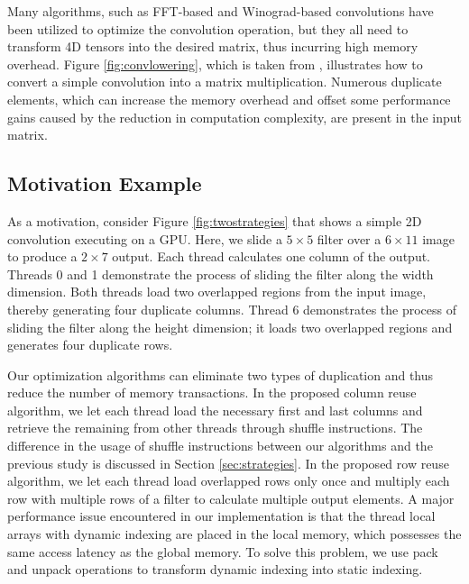 Many algorithms, such as FFT-based and Winograd-based convolutions have been utilized to optimize the convolution operation, but they all need to
transform 4D tensors into the desired matrix, thus incurring high memory overhead. Figure \ref{fig:convlowering}, which is taken from
\cite{ChetlurWVCTCS14}, illustrates how to convert a simple convolution into a matrix multiplication. Numerous duplicate elements, which can increase the memory overhead and offset some performance gains caused by the reduction in computation complexity, are present in the input matrix.


\subsection{Motivation Example}

As a motivation, consider Figure \ref{fig:twostrategies} that shows a simple 2D convolution executing on a GPU. Here, we slide a $5 \times
5$ filter over a $6 \times 11$ image to produce a $2 \times 7$ output. Each thread calculates one column of the output. Threads 0 and 1
demonstrate the process of sliding the filter along the width dimension. Both threads load two overlapped regions from the input image,
thereby generating four duplicate columns. Thread 6 demonstrates the process of sliding the filter along the height dimension; it loads two
overlapped regions and generates four duplicate rows.

Our optimization algorithms can eliminate two types of duplication and thus reduce the number of memory transactions. In the proposed column reuse algorithm, we let each thread load the necessary first and last columns and retrieve the remaining from other threads through shuffle
instructions. The difference in the usage of shuffle instructions between our algorithms and the previous study
\cite{vasilache2014fast} is discussed in Section \ref{sec:strategies}. In the proposed row reuse algorithm, we let each thread load overlapped
rows only once and multiply each row with multiple rows of a filter to calculate multiple output elements. A major performance issue
encountered in our implementation is that the thread local arrays with dynamic indexing are placed in the local memory, which possesses the same
access latency as the global memory. To solve this problem, we use pack and unpack operations to transform dynamic indexing into static indexing.

